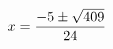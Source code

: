\documentclass[preview]{standalone}
\begin{document}
\begin{align*}
\special{dvisvgm:raw <g id='unique000'>}x=\frac{-5\pm\sqrt{409}}{24}\special{dvisvgm:raw </g>}
\end{align*}
\end{document}
